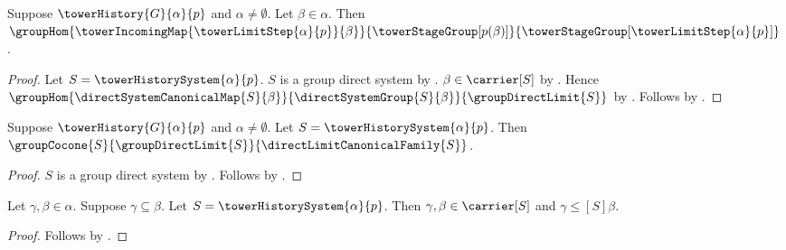 \begin{proposition}\label{tower_limit_step_incoming_hom}
    Suppose $\towerHistory{G}{\alpha}{p}$ and
        $\alpha\neq\emptyset$.
    Let $\beta\in\alpha$.
    Then $\groupHom
        {\towerIncomingMap{\towerLimitStep{\alpha}{p}}{\beta}}
        {\towerStageGroup[p(\beta)]}
        {\towerStageGroup[\towerLimitStep{\alpha}{p}]}$.
\end{proposition}
\begin{proof}
    Let $S=\towerHistorySystem{\alpha}{p}$.
    $S$ is a group direct system by
        .
    $\beta\in\carrier[S]$ by
        .
    Hence $\groupHom
        {\directSystemCanonicalMap{S}{\beta}}
        {\directSystemGroup{S}{\beta}}
        {\groupDirectLimit{S}}$ by
        .
    Follows by .
\end{proof}

\begin{proposition}\label{tower_history_canonical_cocone}
    Suppose $\towerHistory{G}{\alpha}{p}$ and
        $\alpha\neq\emptyset$.
    Let $S=\towerHistorySystem{\alpha}{p}$.
    Then $\groupCocone
        {S}{\groupDirectLimit{S}}{\directLimitCanonicalFamily{S}}$.
\end{proposition}
\begin{proof}
    $S$ is a group direct system by
        .
    Follows by .
\end{proof}

\begin{proposition}\label{tower_history_system_index_relation}
    Let $\gamma,\beta\in\alpha$.
    Suppose $\gamma\subseteq\beta$.
    Let $S=\towerHistorySystem{\alpha}{p}$.
    Then $\gamma,\beta\in\carrier[S]$ and
        $\gamma\mathrel{\leq[S]}\beta$.
\end{proposition}
\begin{proof}
    Follows by
        .
\end{proof}

